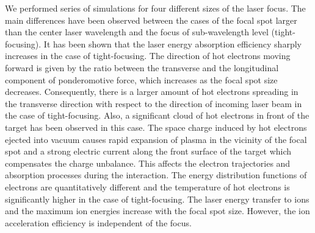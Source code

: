 We performed series of simulations for four different sizes of the laser focus. The main differences have been observed between the cases of the focal spot larger than the center laser wavelength and the focus of sub-wavelength level (tight-focusing). It has been shown that the laser energy absorption efficiency sharply increases in the case of tight-focusing. The direction of hot electrons moving forward is given by the ratio between the transverse and the longitudinal component of ponderomotive force, which increases as the focal spot size decreases. Consequently, there is a larger amount of hot electrons spreading in the transverse direction with respect to the direction of incoming laser beam in the case of tight-focusing. Also, a significant cloud of hot electrons in front of the target has been observed in this case. The space charge induced by hot electrons ejected into vacuum causes rapid expansion of plasma in the vicinity of the focal spot and a strong electric current along the front surface of the target which compensates the charge unbalance. This affects the electron trajectories and absorption processes during the interaction. The energy distribution functions of electrons are quantitatively different and the temperature of hot electrons is significantly higher in the case of tight-focusing. The laser energy transfer to ions and the maximum ion energies increase with the focal spot size. However, the ion acceleration efficiency is independent of the focus.


